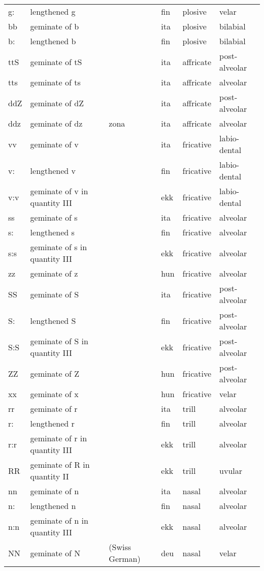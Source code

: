 {\begin{longtable}{l|p{.3\linewidth}|p{.15\linewidth}|l|p{.15\linewidth}|l}
	g:	& lengthened g	& 	& fin	& plosive	& velar	\\
	bb	& geminate of b	& 	& ita	& plosive	& bilabial	\\
	b:	& lengthened b	& 	& fin	& plosive	& bilabial	\\
	ttS	& geminate of tS	& 	& ita	& affricate	& post-alveolar	\\
	tts	& geminate of ts	& 	& ita	& affricate	& alveolar	\\
	ddZ	& geminate of dZ	& 	& ita	& affricate	& post-alveolar	\\
	ddz	& geminate of dz	& zona	& ita	& affricate	& alveolar	\\
	vv	& geminate of v	& 	& ita	& fricative	& labio-dental	\\
	v:	& lengthened v	& 	& fin	& fricative	& labio-dental	\\
	v:v	& geminate of v in quantity III	& 	& ekk	& fricative	& labio-dental	\\
	ss	& geminate of s	& 	& ita	& fricative	& alveolar	\\
	s:	& lengthened s	& 	& fin	& fricative	& alveolar	\\
	s:s	& geminate of s in quantity III	& 	& ekk	& fricative	& alveolar	\\
	zz	& geminate of z	& 	& hun	& fricative	& alveolar	\\
	SS	& geminate of S	& 	& ita	& fricative	& post-alveolar	\\
	S:	& lengthened S	& 	& fin	& fricative	& post-alveolar	\\
	S:S	& geminate of S in quantity III	& 	& ekk	& fricative	& post-alveolar	\\
	ZZ	& geminate of Z	& 	& hun	& fricative	& post-alveolar	\\
	xx	& geminate of x	& 	& hun	& fricative	& velar	\\
	rr	& geminate of r	& 	& ita	& trill	& alveolar	\\
	r:	& lengthened r	& 	& fin	& trill	& alveolar	\\
	r:r	& geminate of r in quantity III	& 	& ekk	& trill	& alveolar	\\
	RR	& geminate of R in quantity II	& 	& ekk	& trill	& uvular	\\
	nn	& geminate of n	& 	& ita	& nasal	& alveolar	\\
	n:	& lengthened n	& 	& fin	& nasal	& alveolar	\\
	n:n	& geminate of n in quantity III	& 	& ekk	& nasal	& alveolar	\\
	NN	& geminate of N	& (Swiss German)	& deu	& nasal	& velar	\\

\end{longtable}}
